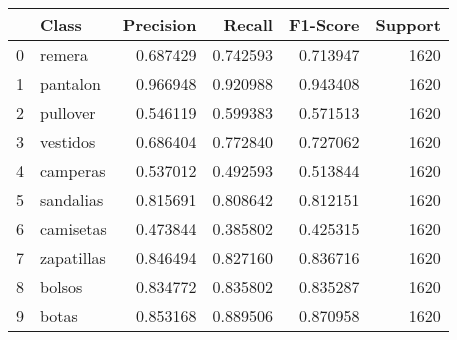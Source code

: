 \begin{tabular}{llrrrr}
\toprule
 & Class & Precision & Recall & F1-Score & Support \\
\midrule
0 & remera & 0.687429 & 0.742593 & 0.713947 & 1620 \\
1 & pantalon & 0.966948 & 0.920988 & 0.943408 & 1620 \\
2 & pullover & 0.546119 & 0.599383 & 0.571513 & 1620 \\
3 & vestidos & 0.686404 & 0.772840 & 0.727062 & 1620 \\
4 & camperas & 0.537012 & 0.492593 & 0.513844 & 1620 \\
5 & sandalias & 0.815691 & 0.808642 & 0.812151 & 1620 \\
6 & camisetas & 0.473844 & 0.385802 & 0.425315 & 1620 \\
7 & zapatillas & 0.846494 & 0.827160 & 0.836716 & 1620 \\
8 & bolsos & 0.834772 & 0.835802 & 0.835287 & 1620 \\
9 & botas & 0.853168 & 0.889506 & 0.870958 & 1620 \\
\bottomrule
\end{tabular}
